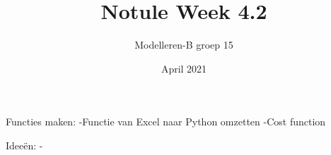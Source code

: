 \documentclass{article}
\title{Notule Week 4.2}
\author{Modelleren-B groep 15}
\date{April 2021}
\begin{document}
Functies maken:
-Functie van Excel naar Python omzetten
-Cost function

Ideeën:
-
\end{document}
